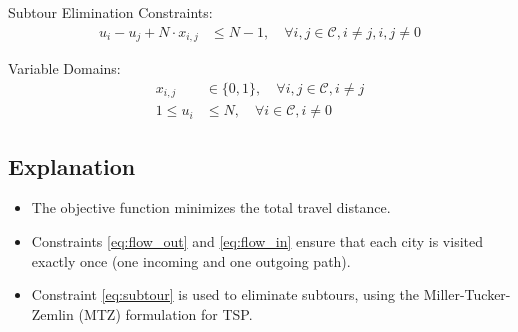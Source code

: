 \documentclass{article}
\begin{document}
Subtour Elimination Constraints:
\begin{align}
u_i - u_j + N \cdot x_{i,j} &\leq N-1, \quad \forall i,j \in \mathcal{C}, i \neq j, i,j \neq 0 \label{eq:subtour}
\end{align}

Variable Domains:
\begin{align}
x_{i,j} &\in \{0, 1\}, \quad \forall i, j \in \mathcal{C}, i \neq j \\
1 \leq u_i &\leq N, \quad \forall i \in \mathcal{C}, i \neq 0
\end{align}

\subsection*{Explanation}
\begin{itemize}
    \item The objective function minimizes the total travel distance.
    \item Constraints \eqref{eq:flow_out} and \eqref{eq:flow_in} ensure that each city is visited exactly once (one incoming and one outgoing path).
    \item Constraint \eqref{eq:subtour} is used to eliminate subtours, using the Miller-Tucker-Zemlin (MTZ) formulation for TSP.
\end{itemize}
\end{document}
